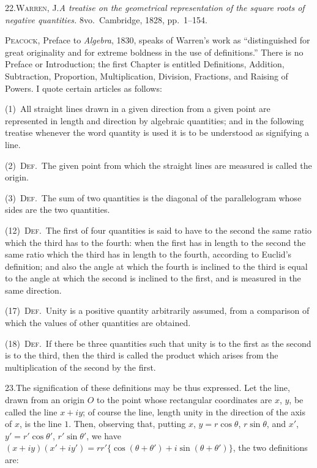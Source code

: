 \documentclass[11pt]{article}
\begin{document}
\smallskip

22.\quad \textsc{Warren, J.}\quad \textit{A treatise on the geometrical representation of the square roots of negative quantities.} 8vo.\ Cambridge, 1828, pp.~1--154.

\textsc{Peacock}, Preface to \textit{Algebra}, 1830, speaks of Warren's work as ``distinguished for great originality and for extreme boldness in the use of definitions.'' There is no Preface or Introduction; the first Chapter is entitled Definitions, Addition, Subtraction, Proportion, Multiplication, Division, Fractions, and Raising of Powers. I quote certain articles as follows:

(1)~All straight lines drawn in a given direction from a given point are represented in length and direction by algebraic quantities; and in the following treatise whenever the word quantity is used it is to be understood as signifying a line.

(2)~\textsc{Def.}\ The given point from which the straight lines are measured is called the origin.

(3)~\textsc{Def.}\ The sum of two quantities is the diagonal of the parallelogram whose sides are the two quantities.

(12)~\textsc{Def.}\ The first of four quantities is said to have to the second the same ratio which the third has to the fourth: when the first has in length to the second the same ratio which the third has in length to the fourth, according to Euclid's definition; and also the angle at which the fourth is inclined to the third is equal to the angle at which the second is inclined to the first, and is measured in the same direction.

(17)~\textsc{Def.}\ Unity is a positive quantity arbitrarily assumed, from a comparison of which the values of other quantities are obtained.

(18)~\textsc{Def.}\ If there be three quantities such that unity is to the first as the second is to the third, then the third is called the product which arises from the multiplication of the second by the first.

23.\quad The signification of these definitions may be thus expressed. Let the line, drawn from an origin $O$ to the point whose rectangular coordinates are $x$, $y$, be called the line $x + iy$; of course the line, length unity in the direction of the axis of $x$, is the line $1$. Then, observing that, putting $x$, $y = r\cos\theta$, $r\sin\theta$, and $x'$, $y' = r'\cos\theta'$, $r'\sin\theta'$, we have $(x + iy)(x' + iy') = rr'\{\cos(\theta + \theta') + i\sin(\theta + \theta')\}$, the two definitions are:
\end{document}
